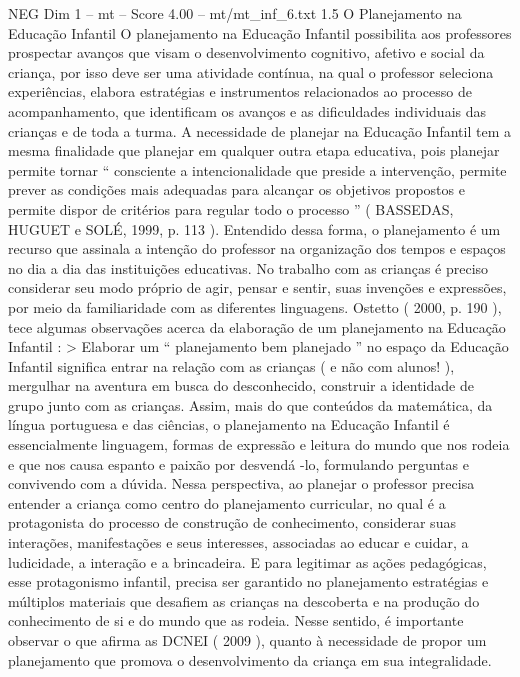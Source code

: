 \begin{textsample}{NEG Dim 1 – mt – Score 4.00 – mt/mt\_inf\_6.txt}  \label{ex:f1_neg_219}
1.5 O Planejamento na Educação Infantil O planejamento na Educação Infantil possibilita aos professores prospectar avanços que visam o desenvolvimento cognitivo, afetivo e social da criança, por isso deve ser uma atividade contínua, na qual o professor seleciona experiências, elabora estratégias e instrumentos relacionados ao processo de acompanhamento, que identificam os avanços e as dificuldades individuais das crianças e de toda a turma.
A necessidade de planejar na Educação Infantil tem a mesma finalidade que planejar em qualquer outra etapa educativa, pois planejar permite tornar “ consciente a intencionalidade que preside a intervenção, permite prever as condições mais adequadas para alcançar os objetivos propostos e permite dispor de critérios para regular todo o processo ” ( BASSEDAS, HUGUET e SOLÉ, 1999, p. 113 ).
Entendido dessa forma, o planejamento é um recurso que assinala a intenção do professor na organização dos tempos e espaços no dia a dia das instituições educativas.
No trabalho com as crianças é preciso considerar seu modo próprio de agir, pensar e sentir, suas invenções e expressões, por meio da familiaridade com as diferentes linguagens.
Ostetto ( 2000, p. 190 ), tece algumas observações acerca da elaboração de um planejamento na Educação Infantil : > Elaborar um “ planejamento bem planejado ” no espaço da Educação Infantil significa entrar na relação com as crianças ( e não com alunos! ), mergulhar na aventura em busca do desconhecido, construir a identidade de grupo junto com as crianças.
Assim, mais do que conteúdos da matemática, da língua portuguesa e das ciências, o planejamento na Educação Infantil é essencialmente linguagem, formas de expressão e leitura do mundo que nos rodeia e que nos causa espanto e paixão por desvendá -lo, formulando perguntas e convivendo com a dúvida.
Nessa perspectiva, ao planejar o professor precisa entender a criança como centro do planejamento curricular, no qual é a protagonista do processo de construção de conhecimento, considerar suas interações, manifestações e seus interesses, associadas ao educar e cuidar, a ludicidade, a interação e a brincadeira.
E para legitimar as ações pedagógicas, esse protagonismo infantil, precisa ser garantido no planejamento estratégias e múltiplos materiais que desafiem as crianças na descoberta e na produção do conhecimento de si e do mundo que as rodeia.
Nesse sentido, é importante observar o que afirma as DCNEI ( 2009 ), quanto à necessidade de propor um planejamento que promova o desenvolvimento da criança em sua integralidade.

\end{textsample}
